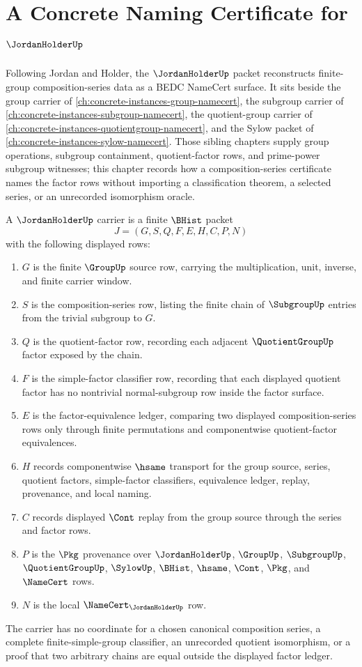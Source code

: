 \chapter{A Concrete Naming Certificate for $\JordanHolderUp$}
\label{ch:concrete-instances-jordan-holder-namecert}

Following Jordan and Holder, the $\JordanHolderUp$ packet reconstructs finite-group composition-series data as a BEDC NameCert surface. It sits beside the group carrier of \autoref{ch:concrete-instances-group-namecert}, the subgroup carrier of \autoref{ch:concrete-instances-subgroup-namecert}, the quotient-group carrier of \autoref{ch:concrete-instances-quotientgroup-namecert}, and the Sylow packet of \autoref{ch:concrete-instances-sylow-namecert}. Those sibling chapters supply group operations, subgroup containment, quotient-factor rows, and prime-power subgroup witnesses; this chapter records how a composition-series certificate names the factor rows without importing a classification theorem, a selected series, or an unrecorded isomorphism oracle.

\begin{definition}
\label{def:jordan-holder-carrier}
A $\JordanHolderUp$ carrier is a finite $\BHist$ packet
$$
J=(G,S,Q,F,E,H,C,P,N)
$$
with the following displayed rows:
\begin{enumerate}
\item $G$ is the finite $\GroupUp$ source row, carrying the multiplication, unit, inverse, and finite carrier window.
\item $S$ is the composition-series row, listing the finite chain of $\SubgroupUp$ entries from the trivial subgroup to $G$.
\item $Q$ is the quotient-factor row, recording each adjacent $\QuotientGroupUp$ factor exposed by the chain.
\item $F$ is the simple-factor classifier row, recording that each displayed quotient factor has no nontrivial normal-subgroup row inside the factor surface.
\item $E$ is the factor-equivalence ledger, comparing two displayed composition-series rows only through finite permutations and componentwise quotient-factor equivalences.
\item $H$ records componentwise $\hsame$ transport for the group source, series, quotient factors, simple-factor classifiers, equivalence ledger, replay, provenance, and local naming.
\item $C$ records displayed $\Cont$ replay from the group source through the series and factor rows.
\item $P$ is the $\Pkg$ provenance over $\JordanHolderUp$, $\GroupUp$, $\SubgroupUp$, $\QuotientGroupUp$, $\SylowUp$, $\BHist$, $\hsame$, $\Cont$, $\Pkg$, and $\NameCert$ rows.
\item $N$ is the local $\NameCert_{\JordanHolderUp}$ row.
\end{enumerate}
The carrier has no coordinate for a chosen canonical composition series, a complete finite-simple-group classifier, an unrecorded quotient isomorphism, or a proof that two arbitrary chains are equal outside the displayed factor ledger.
\end{definition}

